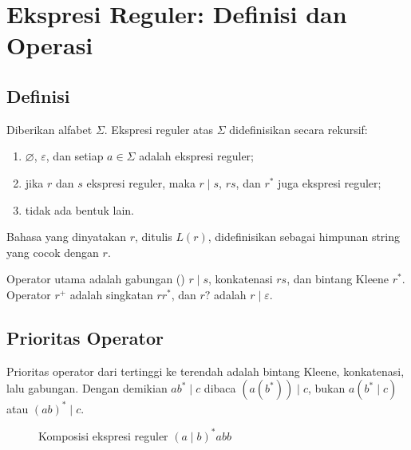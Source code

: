 \section{Ekspresi Reguler: Definisi dan Operasi}
\label{sec:ch05-regex}

\subsection{Definisi}

\begin{definisi}
Diberikan alfabet \(\Sigma\). Ekspresi reguler atas \(\Sigma\)
didefinisikan secara rekursif:
\begin{enumerate}[label=(\roman*),leftmargin=*]
  \item \(\varnothing\), \(\varepsilon\), dan setiap \(a \in \Sigma\)
        adalah ekspresi reguler;
  \item jika \(r\) dan \(s\) ekspresi reguler, maka \(r \mid s\),
        \(rs\), dan \(r^{*}\) juga ekspresi reguler;
  \item tidak ada bentuk lain.
\end{enumerate}
Bahasa yang dinyatakan \(r\), ditulis \(L(r)\), didefinisikan
sebagai himpunan string yang cocok dengan \(r\).
\end{definisi}

Operator utama adalah gabungan () \(r \mid s\),
konkatenasi \(rs\), dan bintang Kleene \(r^{*}\). Operator
\(r^{+}\) adalah singkatan \(rr^{*}\), dan \(r?\) adalah
\(r \mid \varepsilon\).

\subsection{Prioritas Operator}

Prioritas operator dari tertinggi ke terendah adalah bintang Kleene,
konkatenasi, lalu gabungan. Dengan demikian
\(ab^{*} \mid c\) dibaca \((a(b^{*})) \mid c\), bukan
\(a(b^{*} \mid c)\) atau \((ab)^{*} \mid c\).

\begin{figure}[H]
\centering
{}
\caption{Komposisi ekspresi reguler \((a \mid b)^{*}abb\)}
\label{fig:ch05-komposisi}
\end{figure}


